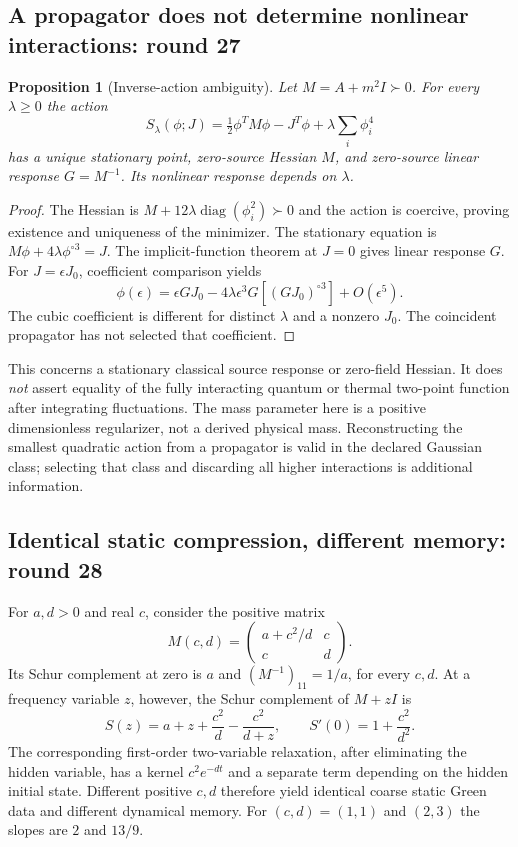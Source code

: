 \documentclass[11pt,a4paper]{article}
\newtheorem{proposition}[theorem]{Proposition}
\newcommand{\diag}{\operatorname{diag}}
\begin{document}
\subsection{A propagator does not determine nonlinear interactions: round 27}

\begin{proposition}[Inverse-action ambiguity]
Let $M=A+m^2I\succ0$. For every $\lambda\ge0$ the action
\[
 S_\lambda(\phi;J)=\tfrac12\phi^TM\phi-J^T\phi
                       +\lambda\sum_i\phi_i^4
\]
has a unique stationary point, zero-source Hessian $M$, and zero-source
linear response $G=M^{-1}$. Its nonlinear response depends on $\lambda$.
\end{proposition}
\begin{proof}
The Hessian is $M+12\lambda\diag(\phi_i^2)\succ0$ and the action is
coercive, proving existence and uniqueness of the minimizer. The stationary
equation is $M\phi+4\lambda\phi^{\circ3}=J$. The implicit-function
theorem at $J=0$ gives linear response $G$. For $J=\epsilon J_0$,
coefficient comparison yields
\[
 \phi(\epsilon)=\epsilon GJ_0
 -4\lambda\epsilon^3G[(GJ_0)^{\circ3}]+O(\epsilon^5).
\]
The cubic coefficient is different for distinct $\lambda$ and a nonzero
$J_0$. The coincident propagator has not selected that coefficient.
\end{proof}

This concerns a stationary classical source response or zero-field Hessian.
It does \emph{not} assert equality of the fully interacting quantum or
thermal two-point function after integrating fluctuations. The mass
parameter here is a positive dimensionless regularizer, not a derived
physical mass. Reconstructing the smallest quadratic action from a
propagator is valid in the declared Gaussian class; selecting that class
and discarding all higher interactions is additional information.

\subsection{Identical static compression, different memory: round 28}

For $a,d>0$ and real $c$, consider the positive matrix
\[
 M(c,d)=\begin{pmatrix}a+c^2/d&c\\c&d\end{pmatrix}.
\]
Its Schur complement at zero is $a$ and
$(M^{-1})_{11}=1/a$, for every $c,d$. At a frequency variable $z$, however,
the Schur complement of $M+zI$ is
\[
 S(z)=a+z+\frac{c^2}{d}-\frac{c^2}{d+z},\qquad
 S'(0)=1+\frac{c^2}{d^2}.
\]
The corresponding first-order two-variable relaxation, after eliminating
the hidden variable, has a kernel $c^2e^{-dt}$ and a separate term depending
on the hidden initial state. Different positive $c,d$ therefore yield
identical coarse static Green data and different dynamical memory.
For $(c,d)=(1,1)$ and $(2,3)$ the slopes are $2$ and $13/9$.
\end{document}
